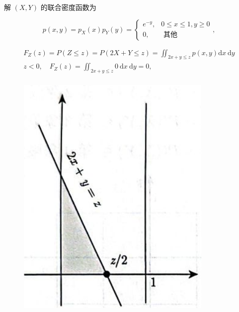 \documentclass{beamer}
\begin{document}
	\begin{frame}
		解 $(X, Y)$ 的联合密度函数为
		
		$$
		p(x, y)=p_{X}(x) p_{Y}(y)=\left\{\begin{array}{cc}
			e^{-y}, & 0 \leqslant x \leqslant 1, y \geqslant 0 \\
			0, & \text { 其他 }
		\end{array},\right.
		$$
		
		$$
		\begin{gathered}
			F_{Z}(z)=P(Z \leqslant z)=P(2 X+Y \leqslant z)=\iint_{2 x+y \leqslant z} p(x, y) \mathrm{d} x \mathrm{~d} y \\
			z<0, \quad F_{Z}(z)=\iint_{2 x+y \leqslant z} 0 \mathrm{~d} x \mathrm{~d} y=0, \\
		\end{gathered}
		$$
		\begin{figure}
			\centering
			\includegraphics[scale = 0.2]{figures/figure3-53}
		\end{figure}
	\end{frame}
	
\end{document}
